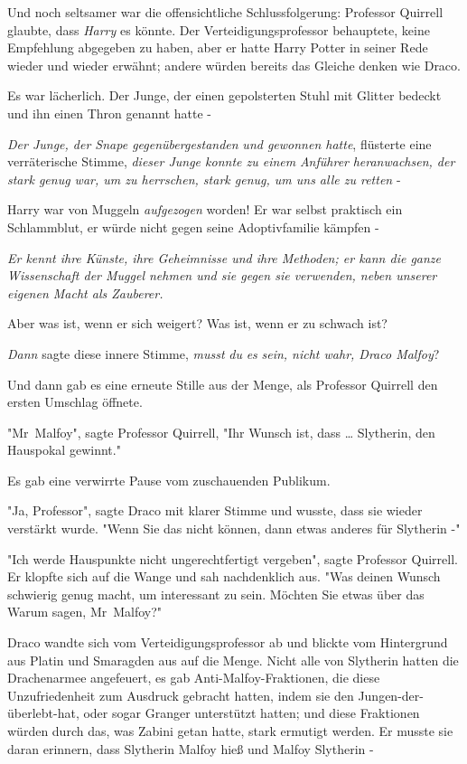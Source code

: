 {Und noch seltsamer war die offensichtliche Schlussfolgerung: Professor Quirrell glaubte, dass \emph{Harry} es könnte. Der Verteidigungsprofessor behauptete, keine Empfehlung abgegeben zu haben, aber er hatte Harry Potter in seiner Rede wieder und wieder erwähnt; andere würden bereits das Gleiche denken wie Draco.

Es war lächerlich. Der Junge, der einen gepolsterten Stuhl mit Glitter bedeckt und ihn einen Thron genannt hatte -

\emph{Der Junge, der Snape gegenübergestanden} \emph{und gewonnen hatte}, flüsterte eine verräterische Stimme, \emph{dieser Junge konnte zu einem} \emph{Anführer} \emph{heranwachsen, der stark genug war, um zu herrschen, stark genug, um uns alle zu retten} -

Harry war von Muggeln \emph{aufgezogen} worden! Er war selbst praktisch ein Schlammblut, er würde nicht gegen seine Adoptivfamilie kämpfen -

\emph{Er kennt ihre Künste, ihre Geheimnisse und ihre Methoden; er kann die ganze Wissenschaft der Muggel nehmen und sie gegen sie verwenden, neben unserer eigenen Macht als Zauberer.}

Aber was ist, wenn er sich weigert? Was ist, wenn er zu schwach ist?

\emph{Dann} sagte diese innere Stimme, \emph{musst} \emph{du} \emph{es} \emph{sein, nicht wahr, Draco Malfoy}?

Und dann gab es eine erneute Stille aus der Menge, als Professor Quirrell den ersten Umschlag öffnete.

"Mr~Malfoy", sagte Professor Quirrell, "Ihr Wunsch ist, dass … Slytherin, den Hauspokal gewinnt."

Es gab eine verwirrte Pause vom zuschauenden Publikum.

"Ja, Professor", sagte Draco mit klarer Stimme und wusste, dass sie wieder verstärkt wurde. "Wenn Sie das nicht können, dann etwas anderes für Slytherin -"

"Ich werde Hauspunkte nicht ungerechtfertigt vergeben", sagte Professor Quirrell. Er klopfte sich auf die Wange und sah nachdenklich aus. "Was deinen Wunsch schwierig genug macht, um interessant zu sein. Möchten Sie etwas über das Warum sagen, Mr~Malfoy?"

Draco wandte sich vom Verteidigungsprofessor ab und blickte vom Hintergrund aus Platin und Smaragden aus auf die Menge. Nicht alle von Slytherin hatten die Drachenarmee angefeuert, es gab Anti-Malfoy-Fraktionen, die diese Unzufriedenheit zum Ausdruck gebracht hatten, indem sie den Jungen-der-überlebt-hat, oder sogar Granger unterstützt hatten; und diese Fraktionen würden durch das, was Zabini getan hatte, stark ermutigt werden. Er musste sie daran erinnern, dass Slytherin Malfoy hieß und Malfoy Slytherin -

}
